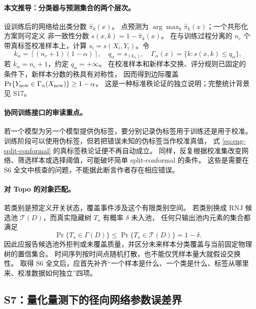 \paragraph{本文推导：分类器与预测集合的两个层次。}
设训练后的网络给出类分数 $\widehat\pi_k(x)$。
点预测为 $\arg\max_k\widehat\pi_k(x)$；一个共形化方案则可定义
非一致性分数 $s(x,k)=1-\widehat\pi_k(x)$。
在与训练过程分离的 $n_c$ 个带真标签校准样本上，计算
$s_i=s(X_i,Y_i)$。令
\begin{equation}
 k_\alpha=\left\lceil(n_c+1)(1-\alpha)\right\rceil,
 \quad q_\alpha=s_{(k_\alpha)},
 \quad \Gamma_\alpha(x)=\{k:s(x,k)\leq q_\alpha\},
 \label{eq:eng-split-conformal}
\end{equation}
若 $k_\alpha=n_c+1$，约定 $q_\alpha=+\infty$。
在校准样本和新样本交换、评分规则已固定的条件下，新样本分数的秩具有对称性，
因而得到边际覆盖 $\Pr\{Y_{\rm new}\in\Gamma_\alpha(X_{\rm new})\}\geq1-\alpha$。
这是一种标准秩论证的独立说明；完整统计背景见 S17。

\paragraph{协同训练接口的审读重点。}
若一个模型为另一个模型提供伪标签，要分别记录伪标签用于训练还是用于校准。
训练阶段可以使用伪标签，但若把错误未知的伪标签当作校准真值，
式 \eqref{eq:eng-split-conformal} 的真标签秩论证便不再自动成立。
同样，反复根据校准集改变网络、筛选样本或选择阈值，可能破坏简单 split-conformal 的条件。
这些是需要在 S6 全文中核查的问题，不能据此断言作者存在相应错误。

\paragraph{对 Topo 的对象匹配。}
若类别是预定义开关状态，覆盖事件涉及这个有限类别空间。
若类别换成 RNJ 候选池 $\mathcal T(D)$，而真实隐藏树 $T_\star$ 有概率 $\delta$ 未入池，
任何只输出池内元素的集合都满足
\begin{equation}
 \Pr\{T_\star\in\Gamma(D)\}\leq
 \Pr\{T_\star\in\mathcal T(D)\}=1-\delta.
 \label{eq:eng-pool-ceiling}
\end{equation}
因此应报告候选池外拒判或未覆盖质量，并区分未来样本分类覆盖与当前固定物理树的置信集合。
时间序列按时间点随机打散，也不能仅凭样本量大就假设交换性。
取得 S6 全文后，应首先补齐“一个样本是什么、一个类是什么、标签从哪里来、校准数据如何独立”四项。

\subsection{S7：量化量测下的径向网络参数误差界}
\label{subsec:S7}

